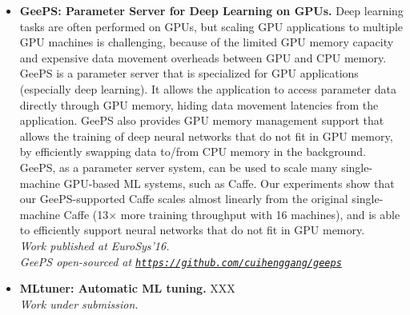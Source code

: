 \documentclass[10pt]{article}
\newenvironment{innerlist}[1][\enskip\textbullet]%
        {\begin{itemize}[#1,leftmargin=*,parsep=0pt,itemsep=0pt,topsep=0pt,partopsep=0pt]}
        {\end{itemize}}
\newcommand{\halfblankline}{\quad\vspace{-0.5\baselineskip}\pagebreak[3]}
\providecommand*\url[1]{\href{#1}{#1}}
\renewcommand*\url[1]{\href{#1}{\texttt{#1}}}
\begin{document}
\begin{innerlist}
    \emph{Work published at SoCC'14.}
\vspace{.1in}
\item[] {\bf GeePS: Parameter Server for Deep Learning on GPUs.}
    Deep learning tasks are often performed on GPUs, but scaling GPU applications to multiple GPU machines is challenging, because of the limited GPU memory capacity and expensive data movement overheads between GPU and CPU memory. GeePS is a parameter server that is specialized for GPU applications (especially deep learning). It allows the application to access parameter data directly through GPU memory, hiding data movement latencies from the application. GeePS also provides GPU memory management support that allows the training of deep neural networks that do not fit in GPU memory, by efficiently swapping data to/from CPU memory in the background. GeePS, as a parameter server system, can be used to scale many single-machine GPU-based ML systems, such as Caffe. Our experiments show that our GeePS-supported Caffe scales almost linearly from the original single-machine Caffe (13$\times$ more training throughput with 16 machines), and is able to efficiently support neural networks that do not fit in GPU memory. \\
    \emph{Work published at EuroSys'16.} \\
    \emph{GeePS open-sourced at \url{https://github.com/cuihenggang/geeps}}
\vspace{.1in}
\item[] {\bf MLtuner: Automatic ML tuning.}
    XXX \\
    \emph{Work under submission.} \\
\end{innerlist}

\halfblankline
\end{document}
